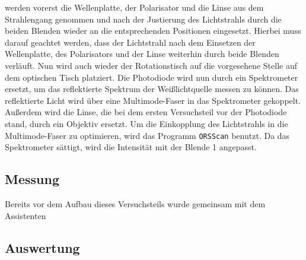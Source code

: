 werden vorerst die Wellenplatte, der Polarisator und die Linse aus dem Strahlengang genommen und nach der Justierung des Lichtstrahls durch die beiden
Blenden wieder an die entsprechenden Positionen eingesetzt. Hierbei muss darauf geachtet werden, dass der Lichtstrahl nach dem Einsetzen der Wellenplatte,
des Polarisators und der Linse weiterhin durch beide Blenden verläuft. Nun wird auch wieder der Rotationstisch auf die vorgesehene Stelle auf dem optischen
Tisch platziert. Die Photodiode wird nun durch ein Spektrometer ersetzt, um das reflektierte Spektrum der Weißlichtquelle messen zu können.
Das reflektierte Licht wird über eine Multimode-Faser in das Spektrometer gekoppelt. Außerdem wird die Linse, die bei dem ersten Versuchsteil vor der Photodiode stand,
durch ein Objektiv ersetzt. Um die Einkopplung des Lichtstrahls in die Multimode-Faser zu optimieren, wird das Programm \texttt{ORSScan} benutzt. Da
das Spektrometer sättigt, wird die Intensität mit der Blende 1 angepasst.
\subsection{Messung}\label{subsec:teil2_messung}
Bereits vor dem Aufbau dieses Versuchsteils wurde gemeinsam mit dem Assistenten
\subsection{Auswertung}\label{subsec:teil2_auswertung}